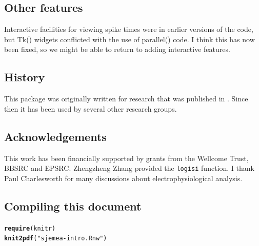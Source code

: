 \documentclass{article}\usepackage[]{graphicx}\usepackage[]{color}
\makeatletter
\newcommand{\hlstr}[1]{\textcolor[rgb]{0.192,0.494,0.8}{#1}}%
\newcommand{\hlkwd}[1]{\textcolor[rgb]{0.737,0.353,0.396}{\textbf{#1}}}%
\newenvironment{kframe}{%
 \def\at@end@of@kframe{}%
 \ifinner\ifhmode%
  \def\at@end@of@kframe{\end{minipage}}%
  \begin{minipage}{\columnwidth}%
 \fi\fi%
 \def\FrameCommand##1{\hskip\@totalleftmargin \hskip-\fboxsep
 \colorbox{shadecolor}{##1}\hskip-\fboxsep
     \hskip-\linewidth \hskip-\@totalleftmargin \hskip\columnwidth}%
 \MakeFramed {\advance\hsize-\width
   \@totalleftmargin\z@ \linewidth\hsize
   \@setminipage}}%
 {\par\unskip\endMakeFramed%
 \at@end@of@kframe}
\newenvironment{knitrout}{}{} %
\makeatother
\begin{document}
\subsection*{Other features}

Interactive facilities for viewing spike times were in earlier
versions of the code, but Tk() widgets conflicted with the use of
parallel() code.  I think this has now been fixed, so we might be able to
return to adding interactive features.

\subsection*{History}

This package was originally written for research that was published in
\citep{Demas2003}.  Since then it has been used by several other
research groups.

\subsection*{Acknowledgements}
This work has been financially supported by grants from the Wellcome
Trust, BBSRC and EPSRC.  Zhengzheng Zhang provided the \texttt{logisi}
function.  I thank Paul Charlesworth for many discussions about
electrophysiological analysis.






\subsection*{Compiling this document}

\begin{knitrout}
\color{fgcolor}\begin{kframe}
\begin{alltt}
\hlkwd{require}(knitr)
\hlkwd{knit2pdf}(\hlstr{"sjemea-intro.Rnw"})
\end{alltt}
\end{kframe}
\end{knitrout}
\end{document}
